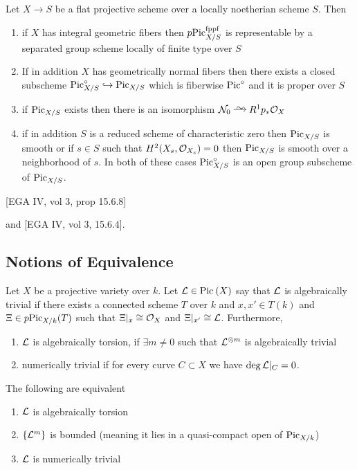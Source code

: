 \documentclass[12pt]{article}
\begin{document}
\newcommand{\cN}{\mathcal{N}}

\begin{theorem}
Let $X \to S$ be a flat projective scheme over a locally noetherian scheme $S$. Then
\begin{enumerate}
\item if $X$ has integral geometric fibers then $p \mathrm{Pic}_{X/S}^{\mathrm{fppf}}$ is representable by a separated group scheme locally of finite type over $S$
\item If in addition $X$ has geometrically normal fibers then there exists a closed subscheme $\mathrm{Pic}^\circ_{X/S} \hookrightarrow \mathrm{Pic}_{X/S}$ which is fiberwise $\mathrm{Pic}^\circ$ and it is proper over $S$
\item if $\mathrm{Pic}_{X/S}$ exists then there is an isomorphism $\cN_{0} \iso R^1 p_* \struct{X}$ \item if in addition $S$ is a reduced scheme of characteristic zero then $\mathrm{Pic}_{X/S}$ is smooth or if $s \in S$ such that $H^2(X_s, \mathcal{O}_{X_s}) = 0$ then $\mathrm{Pic}_{X/S}$ is smooth over a neighborhood of $s$. In both of these cases $\mathrm{Pic}^\circ_{X/S}$ is an open group subscheme of $\mathrm{Pic}_{X/S}$.  
\end{enumerate}
\end{theorem}


[EGA IV, vol 3, prop 15.6.8]

and [EGA IV, vol 3, 15.6.4]. 

\subsection{Notions of Equivalence}

\begin{defn}
Let $X$ be a projective variety over $k$. Let $\mathcal{L} \in \mathrm{Pic}^{} \left( X \right)$ say that $\mathcal{L}$ is algebraically trivial if there exists a connected scheme $T$ over $k$ and $x,x' \in T(k)$ and $\Xi \in p \mathrm{Pic}_{X/k}(T)$ such that $\Xi|_x \cong \mathcal{O}_{X}$ and $\Xi|_{x'} \cong \mathcal{L}$. Furthermore,
\begin{enumerate}
\item $\mathcal{L}$ is algebraically torsion, if $\exists m \neq 0$ such that $\mathcal{L}^{\otimes m}$ is algebraically trivial
\item numerically trivial if for every curve $C \subset X$ we have $\deg{\mathcal{L}|_C} = 0$.
\end{enumerate}
\end{defn}

\begin{theorem}
The following are equivalent
\begin{enumerate}
\item $\mathcal{L}$ is algebraically torsion
\item $\{ \mathcal{L}^m \}$ is bounded (meaning it lies in a quasi-compact open of $\mathrm{Pic}_{X/k}$)
\item $\mathcal{L}$ is numerically trivial
\end{enumerate}
\end{theorem}
\end{document}
